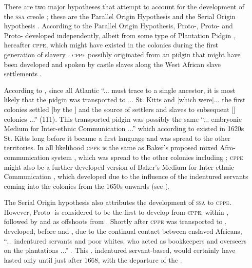 There are two major hypotheses that attempt to account for the development of the \textsc{ssa}  creole ; these are the Parallel Origin Hypothesis and the Serial Origin hypothesis \citep{Smith01}. According to the Parallel Origin Hypothesis, Proto-, Proto- and Proto- developed independently, albeit from some type of  Plantation Pidgin , hereafter \textsc{cppe}, which might have existed in the  colonies during the first generation of slavery  \citep{Smith01, McWhorter98}. \textsc{cppe} possibly originated from an  pidgin that might have been developed and spoken by castle slaves along the West African slave settlements \citep{McWhorter00b}.

According to \citet{McWhorter00b}, since all Atlantic   ``... must trace to a single ancestor, it is most likely that the pidgin was transported to ... St. Kitts and  [which were]... the first colonies settled [by the ] and the source of settlers and slaves to subsequent [] colonies ...'' (111). This transported  pidgin was possibly the same ``... embryonic Medium for Inter-ethnic Communication ...'' which according to \citet[347]{Baker98} existed in 1620s St. Kitts long before it became a first language and was spread to the other  territories. In all likelihood \textsc{cppe} is the same as Baker's proposed mixed Afro- communication system \citep{Baker98}, which was spread to the other  colonies including ; \textsc{cppe} might also be a further developed version of Baker’s Medium for Inter-ethnic Communication \citep{Baker98}, which developed due to the influence of the indentured servants coming into the colonies from the 1650s onwards (see ).

The Serial Origin hypothesis also attributes the development of \textsc{ssa}  to \textsc{cppe}. However, Proto- is considered to be the first to develop from \textsc{cppe}, within , followed by  and  as offshoots from  \citep{Smith01, McWhorter98}. Shortly after \textsc{cppe} was transported to ,  developed, before  and , due to the continual contact between enslaved Africans, ``... indentured servants and poor whites, who acted as bookkeepers and overseers on the plantations ...'' \citep[xii]{Cassidy67}. This , indentured servant-based,  would certainly have lasted only until just after 1668, with the departure of the .


